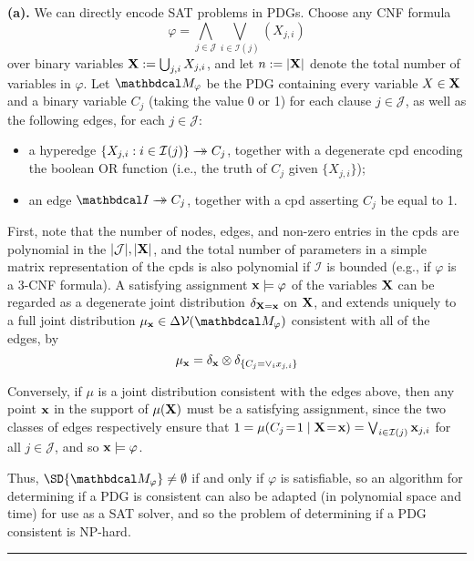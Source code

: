 \begin{lproof} \label{proof:consistent-NP-hard}
    \textbf{(a).}
	We can directly encode SAT problems in PDGs.
	Choose any CNF formula
	$$\varphi = \bigwedge_{j \in \mathcal J} \bigvee_{i \in \mathcal I(j)} (X_{j,i})$$
	over binary variables $\mathbf X := \bigcup_{j,i} X_{j,i}$,
    and let $n := |\mathbf X|$ denote the total number of variables in $\varphi$.
    Let
	$\dg M_\varphi$ be the PDG containing every variable $X \in \mathbf X$ and a binary
	variable $C_j$ (taking the value 0 or 1) for each clause $j \in \mathcal J$, as well as the following edges, for each $j \in \mathcal J$:
	\begin{itemize}
		\item a hyperedge $\{X_{j,i} : i \in \mathcal I(j)\} \rightarrow\mathrel{\mspace{-15mu}}\rightarrow C_j$, together with a degenerate cpd
			encoding the boolean OR function (i.e., the truth of $C_j$ given $\{X_{j,i}\}$);
		\item an edge $\pdgunit \tto C_j$, together with a cpd asserting $C_j$ be equal to 1.
	\end{itemize}
	First, note that the number of nodes, edges, and non-zero entries in the cpds are polynomial in the $|\mathcal J|, |\mathbf X|$, and the total number of parameters in a simple matrix representation of the cpds is also polynomial if $\mathcal I$ is bounded (e.g., if $\varphi$ is a 3-CNF formula).
	A satisfying assignment $\mathbf x \models \varphi$ of the variables $\mathbf X$ can be regarded as a degenerate joint distribution $\delta_{\mathbf X = \mathbf x}$ on $\mathbf X$, and extends uniquely to a full joint distribution $\mu_{\mat x} \in \Delta \V(\dg M_\varphi)$ consistent with all of the edges, by
	\[ \mu_{\mathbf x} = \delta_{\mathbf x} \otimes \delta_{\{C_j = \vee_i  x_{j,i}\}} \]

 	Conversely, if $\mu$ is a joint distribution consistent with the edges above, then any point $\mathbf x$ in the support of $\mu(\mathbf X)$ must be a satisfying assignment, since the two classes of edges respectively ensure that $1 =\mu(C_j\!=\! 1 \mid \mathbf X \!=\! \mathbf x) = \bigvee_{i \in \mathcal I(j)} \mathbf x_{j,i}$ for all $j \in \mathcal J$, and so $\mathbf x \models \varphi$.

	Thus, $\SD{\dg M_\varphi} \ne \emptyset$ if and only if $\varphi$ is satisfiable, so
	an algorithm for determining if a PDG is consistent can also be adapted (in polynomial space and time) for use as a SAT solver, and so the problem of determining if a PDG consistent is NP-hard.


    \medskip\hrule\smallskip


\end{lproof}
